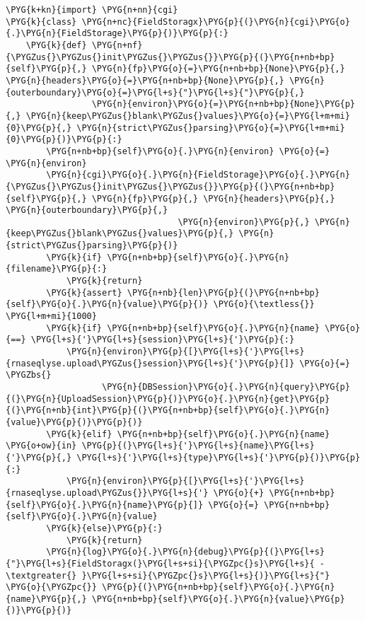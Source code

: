 \begin{Verbatim}[commandchars=\\\{\}]
\PYG{k+kn}{import} \PYG{n+nn}{cgi}
\PYG{k}{class} \PYG{n+nc}{FieldStoragx}\PYG{p}{(}\PYG{n}{cgi}\PYG{o}{.}\PYG{n}{FieldStorage}\PYG{p}{)}\PYG{p}{:}
    \PYG{k}{def} \PYG{n+nf}{\PYGZus{}\PYGZus{}init\PYGZus{}\PYGZus{}}\PYG{p}{(}\PYG{n+nb+bp}{self}\PYG{p}{,} \PYG{n}{fp}\PYG{o}{=}\PYG{n+nb+bp}{None}\PYG{p}{,} \PYG{n}{headers}\PYG{o}{=}\PYG{n+nb+bp}{None}\PYG{p}{,} \PYG{n}{outerboundary}\PYG{o}{=}\PYG{l+s}{"}\PYG{l+s}{"}\PYG{p}{,}
                 \PYG{n}{environ}\PYG{o}{=}\PYG{n+nb+bp}{None}\PYG{p}{,} \PYG{n}{keep\PYGZus{}blank\PYGZus{}values}\PYG{o}{=}\PYG{l+m+mi}{0}\PYG{p}{,} \PYG{n}{strict\PYGZus{}parsing}\PYG{o}{=}\PYG{l+m+mi}{0}\PYG{p}{)}\PYG{p}{:}
        \PYG{n+nb+bp}{self}\PYG{o}{.}\PYG{n}{environ} \PYG{o}{=} \PYG{n}{environ}
        \PYG{n}{cgi}\PYG{o}{.}\PYG{n}{FieldStorage}\PYG{o}{.}\PYG{n}{\PYGZus{}\PYGZus{}init\PYGZus{}\PYGZus{}}\PYG{p}{(}\PYG{n+nb+bp}{self}\PYG{p}{,} \PYG{n}{fp}\PYG{p}{,} \PYG{n}{headers}\PYG{p}{,} \PYG{n}{outerboundary}\PYG{p}{,}
                                  \PYG{n}{environ}\PYG{p}{,} \PYG{n}{keep\PYGZus{}blank\PYGZus{}values}\PYG{p}{,} \PYG{n}{strict\PYGZus{}parsing}\PYG{p}{)}
        \PYG{k}{if} \PYG{n+nb+bp}{self}\PYG{o}{.}\PYG{n}{filename}\PYG{p}{:}
            \PYG{k}{return}
        \PYG{k}{assert} \PYG{n+nb}{len}\PYG{p}{(}\PYG{n+nb+bp}{self}\PYG{o}{.}\PYG{n}{value}\PYG{p}{)} \PYG{o}{\textless{}} \PYG{l+m+mi}{1000}
        \PYG{k}{if} \PYG{n+nb+bp}{self}\PYG{o}{.}\PYG{n}{name} \PYG{o}{==} \PYG{l+s}{'}\PYG{l+s}{session}\PYG{l+s}{'}\PYG{p}{:}
            \PYG{n}{environ}\PYG{p}{[}\PYG{l+s}{'}\PYG{l+s}{rnaseqlyse.upload\PYGZus{}session}\PYG{l+s}{'}\PYG{p}{]} \PYG{o}{=} \PYGZbs{}
                   \PYG{n}{DBSession}\PYG{o}{.}\PYG{n}{query}\PYG{p}{(}\PYG{n}{UploadSession}\PYG{p}{)}\PYG{o}{.}\PYG{n}{get}\PYG{p}{(}\PYG{n+nb}{int}\PYG{p}{(}\PYG{n+nb+bp}{self}\PYG{o}{.}\PYG{n}{value}\PYG{p}{)}\PYG{p}{)}
        \PYG{k}{elif} \PYG{n+nb+bp}{self}\PYG{o}{.}\PYG{n}{name} \PYG{o+ow}{in} \PYG{p}{(}\PYG{l+s}{'}\PYG{l+s}{name}\PYG{l+s}{'}\PYG{p}{,} \PYG{l+s}{'}\PYG{l+s}{type}\PYG{l+s}{'}\PYG{p}{)}\PYG{p}{:}
            \PYG{n}{environ}\PYG{p}{[}\PYG{l+s}{'}\PYG{l+s}{rnaseqlyse.upload\PYGZus{}}\PYG{l+s}{'} \PYG{o}{+} \PYG{n+nb+bp}{self}\PYG{o}{.}\PYG{n}{name}\PYG{p}{]} \PYG{o}{=} \PYG{n+nb+bp}{self}\PYG{o}{.}\PYG{n}{value}
        \PYG{k}{else}\PYG{p}{:}
            \PYG{k}{return}
        \PYG{n}{log}\PYG{o}{.}\PYG{n}{debug}\PYG{p}{(}\PYG{l+s}{"}\PYG{l+s}{FieldStoragx(}\PYG{l+s+si}{\PYGZpc{}s}\PYG{l+s}{ -\textgreater{} }\PYG{l+s+si}{\PYGZpc{}s}\PYG{l+s}{)}\PYG{l+s}{"} \PYG{o}{\PYGZpc{}} \PYG{p}{(}\PYG{n+nb+bp}{self}\PYG{o}{.}\PYG{n}{name}\PYG{p}{,} \PYG{n+nb+bp}{self}\PYG{o}{.}\PYG{n}{value}\PYG{p}{)}\PYG{p}{)}


\end{Verbatim}
